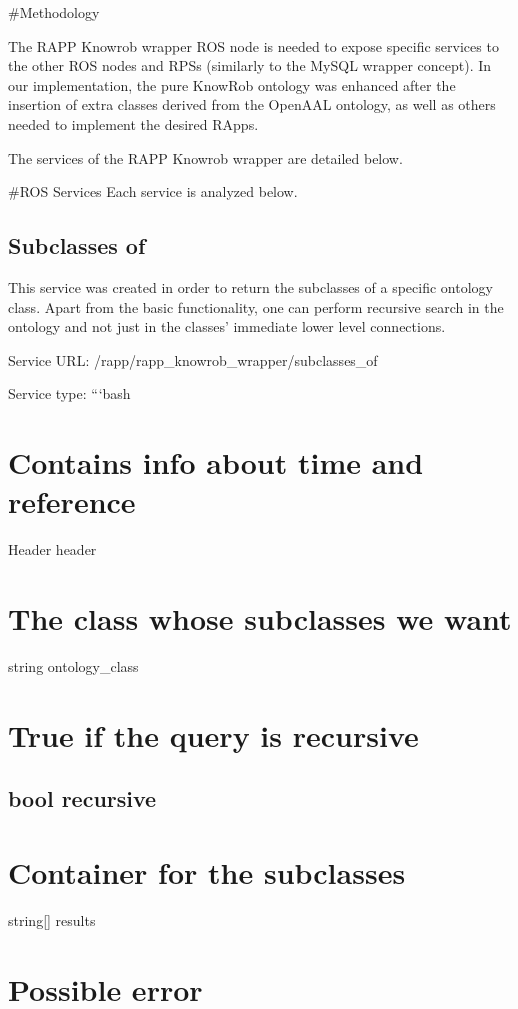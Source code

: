 \#\-Methodology

The R\-A\-P\-P Knowrob wrapper R\-O\-S node is needed to expose specific services to the other R\-O\-S nodes and R\-P\-Ss (similarly to the My\-S\-Q\-L wrapper concept). In our implementation, the pure Know\-Rob ontology was enhanced after the insertion of extra classes derived from the Open\-A\-A\-L ontology, as well as others needed to implement the desired R\-Apps.

The services of the R\-A\-P\-P Knowrob wrapper are detailed below.

\#\-R\-O\-S Services Each service is analyzed below.

\subsection*{Subclasses of}

This service was created in order to return the subclasses of a specific ontology class. Apart from the basic functionality, one can perform recursive search in the ontology and not just in the classes’ immediate lower level connections.

Service U\-R\-L\-: {\ttfamily /rapp/rapp\-\_\-knowrob\-\_\-wrapper/subclasses\-\_\-of}

Service type\-: ```bash \section*{Contains info about time and reference}

Header header \section*{The class whose subclasses we want}

string ontology\-\_\-class \section*{True if the query is recursive}

\subsection*{bool recursive }

\section*{Container for the subclasses}

string\mbox{[}\mbox{]} results \section*{Possible error}

